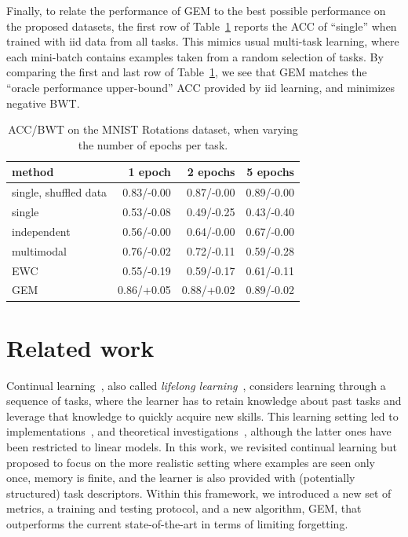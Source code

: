 \documentclass{article}
\begin{document}
Finally, to relate the performance of GEM to the best possible performance on
the proposed datasets, the first row of Table~\ref{table:varying_epochs}
reports the ACC of ``single'' when trained with iid data from all tasks. This
mimics usual multi-task learning, where each mini-batch contains examples taken
from a random selection of tasks.  By comparing the first and last row of
Table~\ref{table:varying_epochs}, we see that GEM matches the ``oracle
performance upper-bound'' ACC provided by iid learning, and minimizes negative
BWT.

\begin{table}
  \caption{ACC/BWT on the MNIST Rotations dataset, when varying the number of
  epochs per task.}
  \begin{center}
  \begin{tabular}{lrrr}
  \toprule
  method & 1 epoch & 2 epochs & 5 epochs \\
  \midrule
  single, shuffled data  &  0.83/{\color{white}-0.00} & 0.87/{\color{white}-0.00} & 0.89/{\color{white}-0.00} \\
  single      & 0.53/-0.08 & 0.49/-0.25 & 0.43/-0.40 \\
  independent & 0.56/-0.00 & 0.64/-0.00 & 0.67/-0.00 \\
  multimodal  & 0.76/-0.02 & 0.72/-0.11 & 0.59/-0.28 \\
  EWC         & 0.55/-0.19 & 0.59/-0.17 & 0.61/-0.11 \\
  GEM         & 0.86/+0.05 & 0.88/+0.02 & 0.89/-0.02 \\
  \bottomrule
  \end{tabular}
  \end{center}
  \label{table:varying_epochs}
\end{table}

\section{Related work}\label{sec:relatedwork}
Continual learning~\citep{ring1994}, also called \emph{lifelong
learning}~\citep{thrun-iros94, learning_to_learn, lifelong, nthing}, considers
learning through a sequence of tasks, where the learner has to retain knowledge
about past tasks and leverage that knowledge to quickly acquire new skills.
This learning setting led to implementations~\citep{nell, ella, child}, and
theoretical investigations~\citep{baxter, balcan_lifelong,pentina16}, although
the latter ones have been restricted to {linear} models. In this work, we
revisited continual learning but proposed to focus on the more realistic
setting where examples are seen only once, memory is finite, and the learner is
also provided with (potentially structured) task descriptors.  Within this
framework, we introduced a new set of metrics, a training and testing protocol,
and a new algorithm, GEM, that outperforms the current state-of-the-art in
terms of limiting forgetting.
\end{document}
